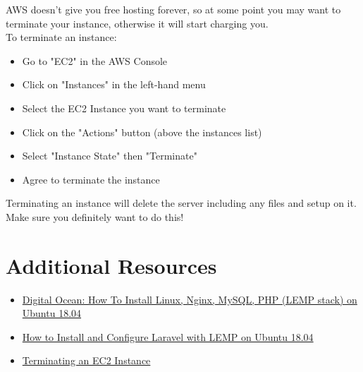 AWS doesn't give you free hosting forever, so at some point you may want to terminate your instance, otherwise it will start charging you.
\\

To terminate an instance:

\begin{itemize}
    \item Go to "EC2" in the AWS Console
    \item Click on "Instances" in the left-hand menu
    \item Select the EC2 Instance you want to terminate
    \item Click on the "Actions" button (above the instances list)
    \item Select "Instance State" then "Terminate"
    \item Agree to terminate the instance
\end{itemize}

Terminating an instance will delete the server including any files and setup on it. Make sure you definitely want to do this!


\section{Additional Resources}

\begin{itemize}[leftmargin=*]
    \item \href{https://www.digitalocean.com/community/tutorials/how-to-install-linux-nginx-mysql-php-lemp-stack-ubuntu-18-04}{Digital Ocean: How To Install Linux, Nginx, MySQL, PHP (LEMP stack) on Ubuntu 18.04}
    \item \href{https://www.digitalocean.com/community/tutorials/how-to-install-and-configure-laravel-with-lemp-on-ubuntu-18-04}{How to Install and Configure Laravel with LEMP on Ubuntu 18.04}
    \item \href{https://docs.aws.amazon.com/AWSEC2/latest/UserGuide/terminating-instances.html}{Terminating an EC2 Instance}
\end{itemize}
